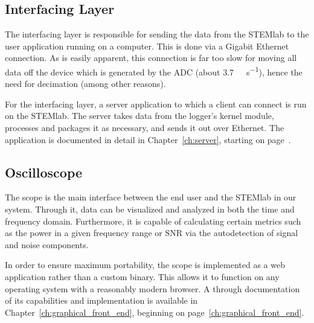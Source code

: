 \subsection{Interfacing Layer} %
\label{subsec:concept:interfacing_layer}

The interfacing layer is responsible for  sending the data from the STEMlab to
the  user application  running  on  a computer. This  is  done  via a  Gigabit
Ethernet connection. As  is easily apparent,  this connection is far  too slow
for  moving all  data off  the device  which is  generated by  the ADC  (about
\SI{3.7}{\gibi\byte\per\second}), hence  the need for decimation  (among other
reasons).

For the interfacing layer, a server  application to which a client can connect
is run on the STEMlab. The server  takes data from the logger's kernel module,
processes and packages  it as necessary, and sends it  out over Ethernet.  The
application is  documented in  detail in Chapter~\ref{ch:server},  starting on
page~\pageref{ch:server}.

%
%
\subsection{Oscilloscope} %
\label{subsec:concept:scope}

The scope is  the main interface between  the end user and the  STEMlab in our
system. Through it, data  can be visualized and analyzed in  both the time and
frequency domain.  Furthermore,  it is capable of  calculating certain metrics
such as the power  in a given frequency range or SNR  via the autodetection of
signal and noise components.

In  order  to  ensure  maximum   portability,  the  scope  is  implemented  as
a   web   application   rather   than  a   custom   binary. This   allows   it
to   function   on   any   operating   system   with   a   reasonably   modern
browser. A  through  documentation  of  its  capabilities  and  implementation
is   available    in   Chapter~\ref{ch:graphical_front_end},    beginning   on
page~\ref{ch:graphical_front_end}.



